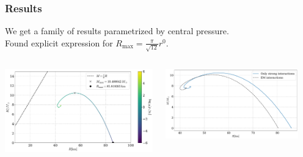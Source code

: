 \documentclass[aspectratio=169]{beamer}
\begin{document}
    \begin{frame}
        \frametitle{Results}
        We get a family of results parametrized by central pressure.\\
        Found explicit expression for $R_\text{max}= \frac{\pi}{\sqrt{12}} r^0$.
        \vspace{1cm}
        \begin{columns}
            \begin{column}{0.55\textwidth}
                \includegraphics[width=\textwidth]{../../scripts/figurer/pion_star/mass_radius_pion_star.pdf}
            \end{column}
            \begin{column}{0.55\textwidth}
                \includegraphics[width=0.9\textwidth]{../../scripts/figurer/pion_star/mass_radius_pion_star_compare.pdf}
            \end{column}
        \end{columns}
    \end{frame}
\end{document}
